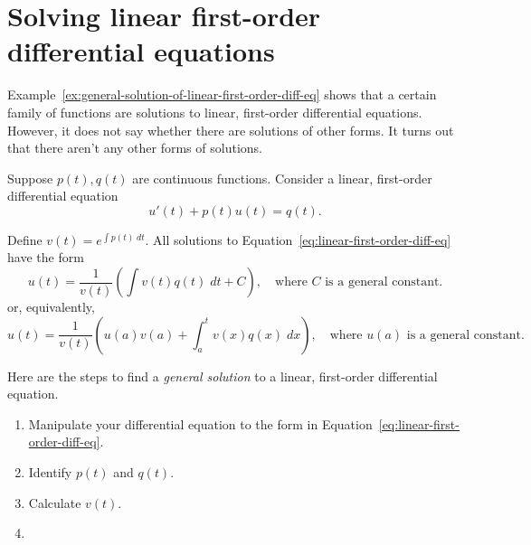 \documentclass[../main.tex]{subfiles}
\begin{document}
 \section{Solving linear first-order differential equations}

Example~\ref{ex:general-solution-of-linear-first-order-diff-eq} shows that a certain family of functions are solutions to linear, first-order differential equations. However, it does not say whether there are solutions of other forms. It turns out that there aren't any other forms of solutions. 

\begin{mdframed}[style=simple-compact]
  Suppose \(p(t), q(t)\) are continuous functions. Consider a linear, first-order differential equation
  \begin{equation} \label{eq:linear-first-order-diff-eq}
    u'(t) + p(t) u(t) = q(t).
  \end{equation}
  
  Define \(v(t) = e^{\int p(t) \;dt}\). All solutions to Equation~\eqref{eq:linear-first-order-diff-eq} have the form
  \[
    u(t) = \frac{1}{v(t)} \left( \int v(t) q(t) \;dt + C \right), \quad\text{where \(C\) is a general constant}.
  \]
  or, equivalently,
  \[
    u(t) = \frac{1}{v(t)} \left( u(a)v(a) + \int_{a}^{t} v(x) q(x) \;dx \right), \quad\text{where \(u(a)\) is a general constant}.
  \]
\end{mdframed}

Here are the steps to find a \emph{general solution} to a linear, first-order differential equation.
\begin{enumerate}
  \item Manipulate your differential equation to the form in Equation~\eqref{eq:linear-first-order-diff-eq}. 
  \item Identify \(p(t)\) and \(q(t)\).
  \item Calculate \(v(t)\).
  \item 
\end{enumerate}
\end{document}
